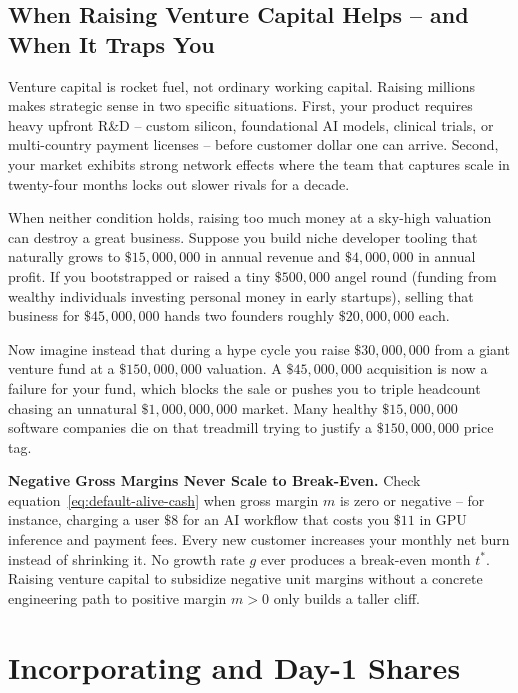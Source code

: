 \subsection{When Raising Venture Capital Helps -- and When It Traps You}

Venture capital is rocket fuel, not ordinary working capital. Raising millions makes strategic sense in two specific situations. First, your product requires heavy upfront R\&D -- custom silicon, foundational AI models, clinical trials, or multi-country payment licenses -- before customer dollar one can arrive. Second, your market exhibits strong network effects where the team that captures scale in twenty-four months locks out slower rivals for a decade.

When neither condition holds, raising too much money at a sky-high valuation can destroy a great business. Suppose you build niche developer tooling that naturally grows to $\$15{,}000{,}000$ in annual revenue and $\$4{,}000{,}000$ in annual profit. If you bootstrapped or raised a tiny $\$500{,}000$ angel round (funding from wealthy individuals investing personal money in early startups), selling that business for $\$45{,}000{,}000$ hands two founders roughly $\$20{,}000{,}000$ each.

Now imagine instead that during a hype cycle you raise $\$30{,}000{,}000$ from a giant venture fund at a $\$150{,}000{,}000$ valuation. A $\$45{,}000{,}000$ acquisition is now a failure for your fund, which blocks the sale or pushes you to triple headcount chasing an unnatural $\$1{,}000{,}000{,}000$ market. Many healthy $\$15{,}000{,}000$ software companies die on that treadmill trying to justify a $\$150{,}000{,}000$ price tag.

\begin{trapbox}
\textbf{Negative Gross Margins Never Scale to Break-Even.}
Check equation~\eqref{eq:default-alive-cash} when gross margin $m$ is zero or negative -- for instance, charging a user $\$8$ for an AI workflow that costs you $\$11$ in GPU inference and payment fees. Every new customer increases your monthly net burn instead of shrinking it. No growth rate $g$ ever produces a break-even month $t^*$. Raising venture capital to subsidize negative unit margins without a concrete engineering path to positive margin $m > 0$ only builds a taller cliff.
\end{trapbox}

\section{Incorporating and Day-1 Shares}
\label{sec:corporate-share-anatomy}


